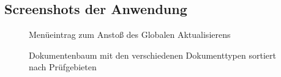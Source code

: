 \subsection{Screenshots der Anwendung}
\label{Screenshots}


\begin{figure}[htb]
\centering
{}
\caption{Menüeintrag zum Anstoß des Globalen Aktualisierens}
\end{figure}

\begin{figure}[htb]
\centering
{}
\caption{Dokumentenbaum mit den verschiedenen Dokumenttypen sortiert nach Prüfgebieten}
\end{figure}
